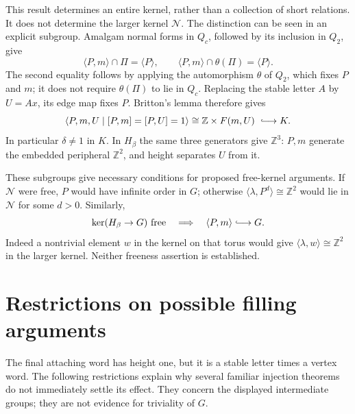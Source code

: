 \documentclass[11pt]{amsart}
\theoremstyle{definition}
\theoremstyle{remark}
\newcommand{\Z}{\mathbb Z}
\begin{document}
This result determines an entire kernel, rather than a collection of
short relations. It does not determine the larger kernel $\mathcal N$.
The distinction can be seen in an explicit subgroup. Amalgam normal
forms in $Q_c$, followed by its inclusion in $Q_2$, give
\[
 \langle P,m\rangle\cap\Pi=\langle P\rangle,
 \qquad \langle P,m\rangle\cap\theta(\Pi)=\langle P\rangle.
\]
The second equality follows by applying the automorphism $\theta$
of $Q_2$, which fixes $P$ and $m$; it does not require
$\theta(\Pi)$ to lie in $Q_c$. Replacing the
stable letter $A$ by $U=Ax$, its edge map fixes $P$. Britton's lemma
therefore gives
\begin{equation}\label{eq:local-product}
 \langle P,m,U\mid[P,m]=[P,U]=1\rangle
       \cong\Z\times F(m,U)\ \lhook\joinrel\longrightarrow K.
\end{equation}
In particular $\delta\ne1$ in $K$. In $H_\beta$ the same three
generators give $\Z^3$: $P,m$ generate the embedded peripheral
$\Z^2$, and height separates $U$ from it.

These subgroups give necessary conditions for proposed free-kernel
arguments. If $\mathcal N$ were free, $P$ would have infinite order
in $G$; otherwise $\langle\lambda,P^d\rangle\cong\Z^2$
would lie in $\mathcal N$ for some $d>0$. Similarly,
\begin{equation}\label{eq:kernel-necessary}
 \ker(H_\beta\to G)\text{ free}\quad\Longrightarrow\quad
                  \langle P,m\rangle\lhook\joinrel\longrightarrow G.
\end{equation}
Indeed a nontrivial element $w$ in the kernel on that torus would give
$\langle\lambda,w\rangle\cong\Z^2$ in the larger kernel.
Neither freeness assertion is established.

\section{Restrictions on possible filling arguments}\label{sec:limits}

The final attaching word has height one, but it is a stable letter
times a vertex word. The following restrictions explain why several
familiar injection theorems do not immediately settle its effect.
They concern the displayed intermediate groups; they are not evidence
for triviality of $G$.
\end{document}
